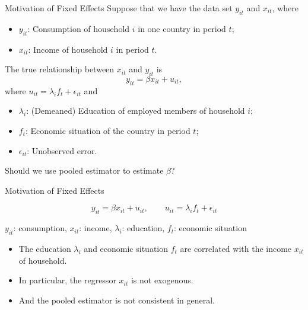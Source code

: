 \documentclass{beamer}
\begin{document}

\begin{frame}{Motivation of Fixed Effects}
    Suppose that we have the data set $y_{it}$ and $x_{it}$, where
    \begin{itemize}
        \item $y_{it}$: Consumption of household $i$ in one country in period $t$;
        \item $x_{it}$: Income of household $i$ in period $t$.
    \end{itemize}
    The true relationship between $x_{it}$ and $y_{it}$ is
    $$y_{it}=\beta x_{it}+u_{it},$$ where $u_{it}=\lambda_if_t+\epsilon_{it}$ and

    \begin{itemize}
        \item $\lambda_i$: (Demeaned) Education of employed members of household $i$;
        \item $f_t$: Economic situation of the country in period $t$;
        \item $\epsilon_{it}$: Unobserved error.
    \end{itemize}

    Should we use pooled estimator to estimate $\beta$?

\end{frame}

\begin{frame}{Motivation of Fixed Effects}
{\color{gray}\footnotesize \[
        y_{it}= \beta x_{it}+u_{it}, \qquad u_{it}=\lambda_if_t+\epsilon_{it}
    \]
   {\centering
   {$y_{it}$: consumption, $x_{it}$: income, $\lambda_i$: education, $f_t$: economic situation}


    }
    }
    \begin{itemize}

        \item The education $\lambda_i$ and economic situation $f_t$ are correlated with the income $x_{it}$ of household.
        \item In particular, the regressor $x_{it}$ is not exogenous.
        \item And the pooled estimator is not consistent in general.
    \end{itemize}
\end{frame}
\end{document}
